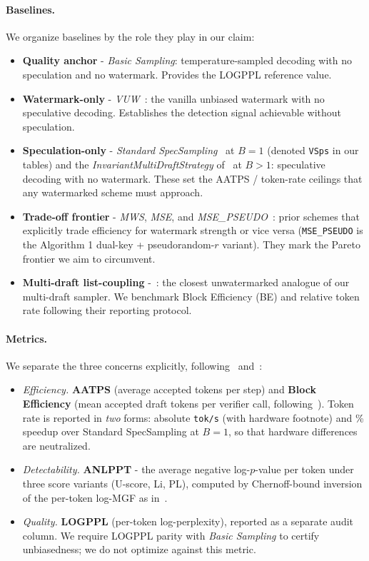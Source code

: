 \documentclass{article}
\theoremstyle{plain}
\theoremstyle{definition}
\begin{document}
\paragraph{Baselines.}
We organize baselines by the role they play in our claim:
\begin{itemize}
  \item \textbf{Quality anchor} - \emph{Basic Sampling}: temperature-sampled
    decoding with no speculation and no watermark. Provides the LOGPPL
    reference value.
  \item \textbf{Watermark-only} - \emph{VUW}~\citep{hu2024inevitable}: the
    vanilla unbiased watermark with no speculative decoding. Establishes
    the detection signal achievable without speculation.
  \item \textbf{Speculation-only} - \emph{Standard
    SpecSampling}~\citep{leviathan2023fast} at $B=1$ (denoted \texttt{VSps}
    in our tables) and the
    \emph{InvariantMultiDraftStrategy} of~\citet{rowan2025list} at $B>1$:
    speculative decoding with no watermark. These set the AATPS / token-rate
    ceilings that any watermarked scheme must approach.
  \item \textbf{Trade-off frontier} - \emph{MWS}, \emph{MSE}, and
    \emph{MSE\_PSEUDO}~\citep{hu2024inevitable}: prior schemes that explicitly
    trade efficiency for watermark strength or vice versa
    (\texttt{MSE\_PSEUDO} is the Algorithm 1 dual-key + pseudorandom-$r$
    variant). They mark the Pareto frontier we aim to circumvent.
  \item \textbf{Multi-draft list-coupling} -~\citet{rowan2025list}:
    the closest unwatermarked analogue of our multi-draft sampler.
    We benchmark Block Efficiency (BE) and relative token rate following
    their reporting protocol.
\end{itemize}

\paragraph{Metrics.}
We separate the three concerns explicitly, following~\citet{hu2024inevitable}
and~\citet{he2026improving}:
\begin{itemize}
  \item \emph{Efficiency.} \textbf{AATPS} (average accepted tokens per step)
    and \textbf{Block Efficiency} (mean accepted draft tokens per verifier
    call, following~\citet{rowan2025list}). Token rate is reported in
    \emph{two} forms: absolute \texttt{tok/s} (with hardware footnote) and
    \% speedup over Standard SpecSampling at $B=1$, so that hardware
    differences are neutralized.
  \item \emph{Detectability.} \textbf{ANLPPT}
    - the average negative log-$p$-value per token under three score
    variants (U-score, Li, PL), computed by Chernoff-bound inversion of
    the per-token log-MGF as in~\citet{hu2024inevitable}.

  \item \emph{Quality.} \textbf{LOGPPL} (per-token log-perplexity), reported
    as a separate audit column. We require LOGPPL parity with
    \emph{Basic Sampling} to certify unbiasedness; we do not optimize
    against this metric.
\end{itemize}
\end{document}

